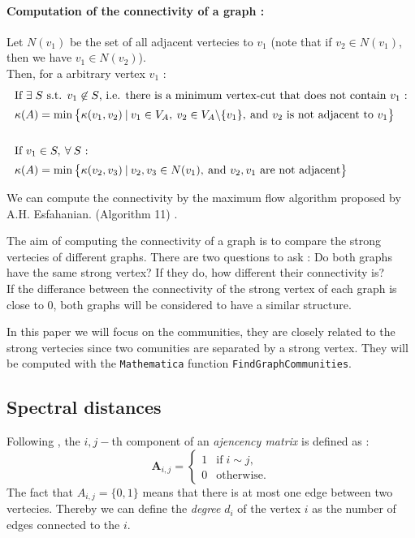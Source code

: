 \documentclass[english, 12pt]{article}
\begin{document}
\paragraph{Computation of the connectivity of a graph :}
Let $N(v_1)$ be the set of all adjacent vertecies to $v_1$ (note that if $v_2\in N(v_1)$, then we have $v_1 \in N(v_2)$).\\
Then, for a arbitrary vertex $v_1$ :
%
\begin{align*}
\shortintertext{If $\exists \; S$ s.t. $v_1 \not\in S$, i.e. there is a minimum vertex-cut that does not contain $v_1$ :}
  \kappa(A) &= \min\big\{\kappa(v_1,v_2) \:|\: v_1 \in V_A,\: v_2 \in V_A\backslash\{v_1\},\: \text{and $v_2$ is not adjacent to $v_1$}\big\}\\\\
\shortintertext{If $v_1 \in S,\: \forall \:S$ :}
  \kappa(A) &= \min\big\{\kappa(v_2,v_3) \:|\: v_2,v_3 \in N(v_1),\:\text{and $v_2,v_1$ are not adjacent}\big\}
\end{align*}

We can compute the connectivity by the maximum flow algorithm proposed by A.H. Esfahanian. (Algorithm 11) \cite{2013Esfahanian}.


The aim of computing the connectivity of a graph is to compare the strong vertecies of different graphs. There are two questions to ask :
Do both graphs have the same strong vertex? If they do, how different their connectivity is?\\
If the differance between the connectivity of the strong vertex of each graph is close to 0, both graphs will be considered to have a similar structure.

In this paper we will focus on the communities, they are closely related to the strong vertecies since two comunities are separated by a strong vertex. They will be computed with the \texttt{Mathematica} function \texttt{FindGraphCommunities}.

\subsection{Spectral distances}

Following \cite{2020Wills}, the $i,j-$th component of an {\it ajencency matrix} is defined as :
$$\mathbf A_{i,j} = \begin{cases}1&\text{if}\; i\sim j,\\0&\text{otherwise.}\end{cases}$$
The fact that $A_{i,j} = \{0,1\}$ means that there is at most one edge between two vertecies. Thereby we can define the {\it degree} $d_i$ of the vertex $i$ as the number of edges connected to the $i$.
\end{document}
